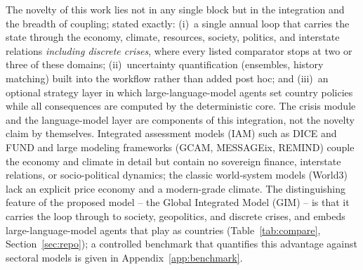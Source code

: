 \documentclass[a4paper,fleqn]{cas-sc}
\begin{document}
The novelty of this work lies not in any single block but in the integration and the breadth of
coupling; stated exactly: (i)~a single annual loop that carries the state through the economy,
climate, resources, society, politics, and interstate relations \emph{including discrete crises},
where every listed comparator stops at two or three of these domains; (ii)~uncertainty
quantification (ensembles, history matching) built into the workflow rather than added post hoc;
and (iii)~an optional strategy layer in which large-language-model agents set country policies
while all consequences are computed by the deterministic core. The crisis module and the
language-model layer are components of this integration, not the novelty claim by themselves. Integrated assessment models (IAM) such as DICE and FUND and large modeling frameworks (GCAM, MESSAGEix, REMIND) couple the economy and climate in detail but contain no sovereign finance, interstate relations, or
socio-political dynamics; the classic world-system models (World3) lack an explicit price economy
and a modern-grade climate. The distinguishing feature of the proposed model -- the Global
Integrated Model (GIM) -- is that it carries the loop through to society, geopolitics, and discrete
crises, and embeds large-language-model agents that play as countries
(Table~\ref{tab:compare}, Section~\ref{sec:repo}); a controlled benchmark that quantifies this
advantage against sectoral models is given in Appendix~\ref{app:benchmark}.
\end{document}
